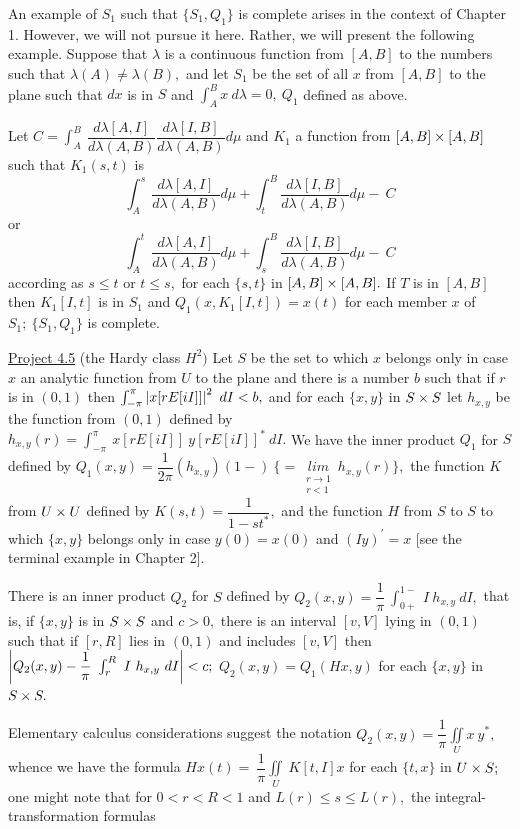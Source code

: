 An example of $S_{1}$ such that $\{S_{1},Q_{1}\}$ is complete arises in the context of Chapter 1.   However, we will not pursue it here. Rather, we will present the following example.  Suppose that $\lambda$ is a continuous function from $[A,B]$ to the numbers such that $\lambda(A) \neq \lambda(B),$  and let $S_{1}$ be the set of all $x$ from $[A,B]$ to the plane such that $dx$ is in $S$ and $\int_{A}^{B} x~d\lambda = 0, ~Q_{1}$ defined as above.\nl

Let $C = \int_{A}^{B}~\dfrac{d\lambda[A,I]}{d\lambda(A,B)}\dfrac{d\lambda[I,B]}{d\lambda(A,B)}d\mu$ and $K_{1}$ a function from $[A,B] \times [A,B]$ such that $K_{1}(s,t)$ is\nl
\[
\int_{A}^{s}\dfrac{d\lambda [A,I]}{d\lambda(A,B)}d\mu + \int_{t}^{B}\dfrac{d\lambda [I,B]}{d\lambda(A,B)}d\mu - ~C
\]
or
\[
\int_{A}^{t}\dfrac{d\lambda [A,I]}{d\lambda(A,B)}d\mu + \int_{s}^{B}\dfrac{d\lambda [I,B]}{d\lambda(A,B)}d\mu - ~C
\]
according as $s \leq t$ or $t \leq s,$ for each $\{s,t\}$ in $[A,B] \times [A,B].$  If $T$ is in $[A,B]$ then $K_{1}[I,t]$ is in $S_{1}$ and $Q_{1}(x,K_{1}[I,t]) = x(t)$ for each member $x$ of $S_{1};~\{S_{1},Q_{1}\}$ is complete.\np




\ul{Project 4.5}  (the Hardy class $H^{2})$   Let $S$ be the set to which $x$ belongs only in case $x$ an analytic function from $U$ to the plane and there is a number $b$ such that if $r$ is in $(0,1)$ then $\int_{-\pi}^{\pi}\left|x[rE[iI]]\right|^{2}~dI < b,$ and for each $\{x,y\}$ in $S \times S$ let $h_{x,y}$ be the function from $(0,1)$ defined by $h_{x,y}(r) = \int_{-\pi}^{\pi}~x[rE[iI]]~y[rE[iI]]^{*}~dI.$  We have the inner product $Q_{1}$ for $S$ defined by $Q_{1}(x,y) = \dfrac{1}{2\pi}(h_{x,y})(1-)~\{=~\underset{\substack{ r\rightarrow 1 \\ r < 1}}{lim}~h_{x,y}(r)\},$ the function $K$ from $U \times U$ defined by $K(s,t) = \dfrac{1}{1 - st^{*}},$ and the function $H$  from $S$ to $S$ to which $\{x,y\}$ belongs only in case $y(0)= x(0)$ and $(Iy)^{\prime} = x$  [see the terminal example in Chapter 2].\nl

There is an inner product $Q_{2}$ for $S$ defined by $Q_{2}(x,y) = \dfrac{1}{\pi}~\int_{0+}^{1-}~I~h_{x,y}~dI,$ that is, if $\{x,y\}$ is in $S \times S$ and $c > 0,$ there is an interval $[v,V]$ lying in $(0,1)$ such that if $[r,R]$ lies in $(0,1)$ and includes $[v,V]$ then $\left|Q_{2}(x,y) - \dfrac{1}{\pi}~\int_{r}^{R}~I~h_{x,y}~dI\right| < c;$ $Q_{2}(x,y) = Q_{1}(Hx,y)$ for each $\{x,y\}$ in $S \times S.$  \nl

Elementary calculus considerations suggest the notation $Q_{2}(x,y) = \dfrac{1}{\pi} \underset{U}{\iint}x~y^{*},$ whence we have the formula $Hx(t) = ~ \dfrac{1}{\pi} \underset{U}{\iint}~K[t,I] x$ for each $\{t,x\}$ in $U \times S;$  one might note that for $0 < r < R < 1$ and $L(r) \leq s \leq L(r),$ the integral-transformation formulas\nl

